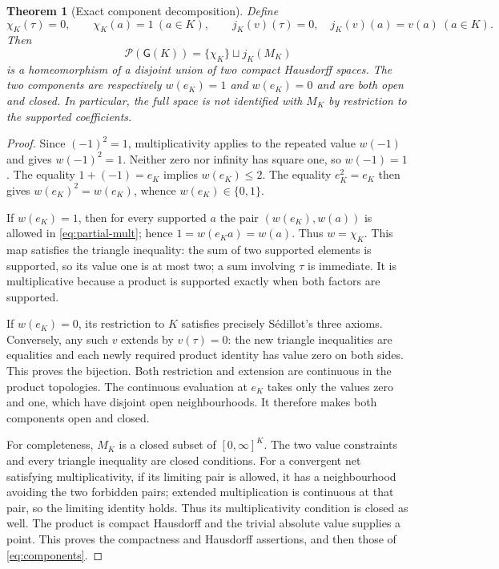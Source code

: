 \documentclass[11pt,a4paper]{article}
\newtheorem{theorem}{Theorem}[section]
\theoremstyle{definition}\newtheorem{definition}[theorem]{Definition}
\newcommand{\G}{\mathsf G}\newcommand{\Tor}{\operatorname{Tor}}\newcommand{\Frac}{\operatorname{Frac}}
\begin{document}
\begin{theorem}[Exact component decomposition]\label{thm:decomposition}
Define
\[
 \chi_K(\tau)=0,\qquad \chi_K(a)=1\ (a\in K),
 \qquad
 j_K(v)(\tau)=0,\quad j_K(v)(a)=v(a)\ (a\in K).
\]
Then
\[
 \mathcal P(\G(K))=\{\chi_K\}\sqcup j_K(M_K)
 \tag{AV2.3}\label{eq:components}
\]
is a homeomorphism of a disjoint union of two compact Hausdorff spaces.
The two components are respectively $w(e_K)=1$ and $w(e_K)=0$ and are
both open and closed. In particular, the full space is not identified
with $M_K$ by restriction to the supported coefficients.
\end{theorem}
\begin{proof}
Since $(-1)^2=1$, multiplicativity applies to the repeated value
$w(-1)$ and gives $w(-1)^2=1$. Neither zero nor infinity has square one,
so $w(-1)=1$. The equality $1+(-1)=e_K$ implies $w(e_K)\le2$.
The equality $e_K^2=e_K$ then gives $w(e_K)^2=w(e_K)$, whence
$w(e_K)\in\{0,1\}$.

If $w(e_K)=1$, then for every supported $a$ the pair
$(w(e_K),w(a))$ is allowed in \eqref{eq:partial-mult}; hence
$1=w(e_Ka)=w(a)$. Thus $w=\chi_K$. This map satisfies the triangle
inequality: the sum of two supported elements is supported, so its
value one is at most two; a sum involving $\tau$ is immediate.
It is multiplicative because a product is supported exactly when both
factors are supported.

If $w(e_K)=0$, its restriction to $K$ satisfies precisely S\'edillot's
three axioms. Conversely, any such $v$ extends by $v(\tau)=0$:
the new triangle inequalities are equalities and each newly required
product identity has value zero on both sides. This proves the bijection.
Both restriction and extension are continuous in the product topologies.
The continuous evaluation at $e_K$ takes only the values zero and one,
which have disjoint open neighbourhoods. It therefore makes both
components open and closed.

For completeness, $M_K$ is a closed subset of $[0,\infty]^K$.
The two value constraints and every triangle inequality are closed
conditions. For a convergent net satisfying multiplicativity, if its
limiting pair is allowed, it has a neighbourhood avoiding the two
forbidden pairs; extended multiplication is continuous at that pair,
so the limiting identity holds. Thus its multiplicativity condition
is closed as well. The product is compact Hausdorff and the trivial
absolute value supplies a point. This proves the compactness and
Hausdorff assertions, and then those of \eqref{eq:components}.
\end{proof}
\end{document}
